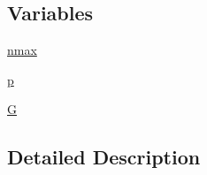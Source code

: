 \subsection*{Variables}
\begin{DoxyCompactItemize}
\item 
\hyperlink{namespaceplot__iterated__dynamical__systems_a75b0c2725adb50615bbff6b196ac1b71}{nmax}
\item 
\hyperlink{namespaceplot__iterated__dynamical__systems_a36b82f4bf0fd518f7e0230a5b05b75ec}{p}
\item 
\hyperlink{namespaceplot__iterated__dynamical__systems_a3d0d344a2ee2a00fea2ef1ae6f21df3d}{G}
\end{DoxyCompactItemize}


\subsection{Detailed Description}
